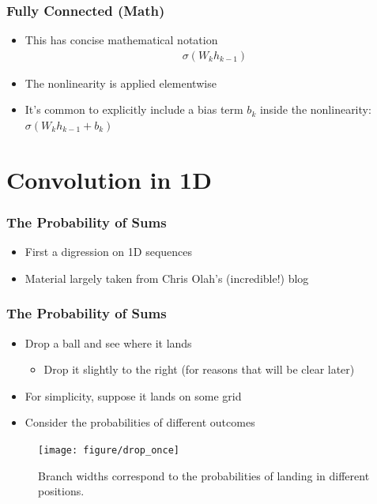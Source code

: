 \documentclass[10pt,mathserif]{beamer}
\begin{document}
\begin{frame}
  \frametitle{Fully Connected (Math)}
  \begin{itemize}
  \item This has concise mathematical notation
    \begin{align*}
      \sigma\left(W_{k}h_{k - 1}\right)
    \end{align*}
  \item The nonlinearity is applied elementwise
  \item It's common to explicitly include a bias term $b_{k}$ inside the
    nonlinearity: $\sigma\left(W_k h_{k - 1} + b_k\right)$
  \end{itemize}
\end{frame}

\section{Convolution in 1D}

\begin{frame}
  \frametitle{The Probability of Sums}
  \begin{itemize}
  \item First a digression on 1D sequences
  \item Material largely taken from Chris Olah's (incredible!) blog
  \end{itemize}
\end{frame}

\begin{frame}
  \frametitle{The Probability of Sums}
  \begin{itemize}
  \item Drop a ball and see where it lands
    \begin{itemize}
    \item Drop it slightly to the right (for reasons that will be clear later)
    \end{itemize}
  \item For simplicity, suppose it lands on some grid
  \item Consider the probabilities of different outcomes
  \end{itemize}
\begin{figure}[ht]
  \centering
  \texttt{[image: figure/drop\_once]}
  \caption{Branch widths correspond to the probabilities of landing in different
    positions. \label{fig:drop_once} }
\end{figure}
\end{frame}
\end{document}
